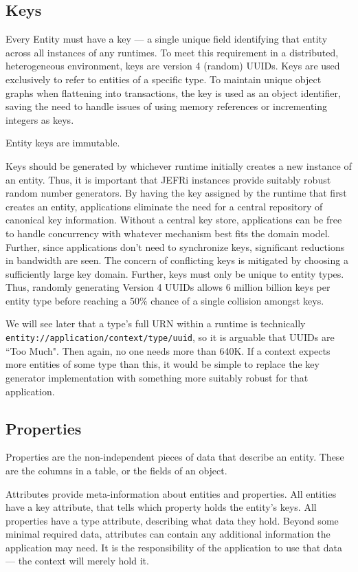 \documentclass{article}
\newcommand{\ilcode}{\tt}
\begin{document}
\subsection{Keys}

Every Entity must have a key --- a single unique field identifying that entity
across all instances of any runtimes. To meet this requirement in a distributed,
heterogeneous environment, keys are version 4 (random) UUIDs. Keys are used
exclusively to refer to entities of a specific type. To maintain unique object
graphs when flattening into transactions, the key is used as an object
identifier, saving the need to handle issues of using memory references or
incrementing integers as keys.

Entity keys are immutable.

Keys should be generated by whichever runtime initially creates a new instance
of an entity. Thus, it is important that JEFRi instances provide suitably robust
random number generators. By having the key assigned by the runtime that first
creates an entity, applications eliminate the need for a central repository of
canonical key information. Without a central key store, applications can be
free to handle concurrency with whatever mechanism best fits the domain model.
Further, since applications don't need to synchronize keys, significant
reductions in bandwidth are seen. The concern of conflicting keys is mitigated
by choosing a sufficiently large key domain. Further, keys must only be unique
to entity types. Thus, randomly generating Version 4 UUIDs allows 6 million
billion keys per entity type before reaching a 50\% chance of a single collision
amongst keys.

We will see later that a type's full URN within a runtime is technically
{\ilcode entity://application/context/type/uuid}, so it is arguable that UUIDs are ``Too
Much". Then again, no one needs more than 640K. If a context expects more
entities of some type than this, it would be simple to replace the key generator
implementation with something more suitably robust for that application.

\subsection{Properties}

Properties are the non-independent pieces of data that describe an entity. These
are the columns in a table, or the fields of an object.

Attributes provide meta-information about entities and
properties. All entities have a key attribute, that tells which property holds
the entity's keys. All properties have a type attribute, describing what data
they hold. Beyond some minimal required data, attributes can contain any
additional information the application may need. It is the responsibility of
the application to use that data --- the context will merely hold it.
\end{document}
